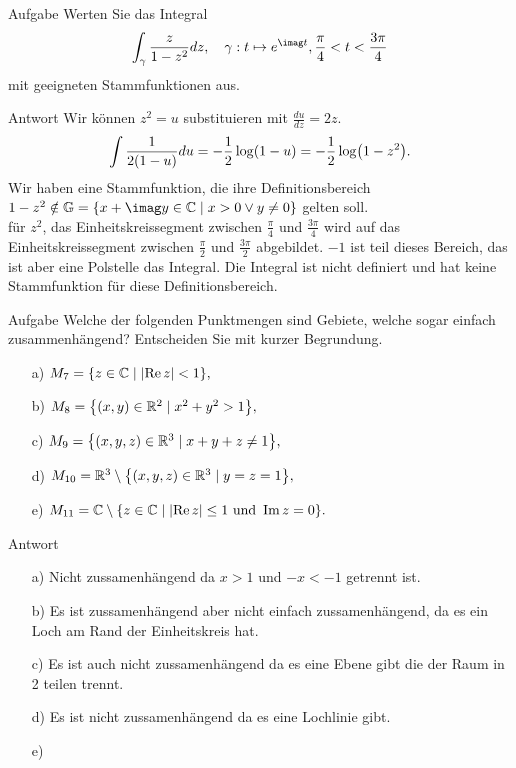 \documentclass{scrartcl}
\begin{document}
\begin{section}{Aufgabe}%
Werten Sie das Integral
\[\int_{\gamma}\frac{z}{1-z^2}dz,\quad \gamma:t\mapsto e^{\imag t},\frac{\pi}{4}<t<\frac{3 \pi}{4}\]
mit geeigneten Stammfunktionen aus.
    \begin{subsection}{Antwort}
        Wir können $z^2=u$ substituieren mit $\frac{du}{dz}=2z$.
        \[\int \frac{1}{2\qty(1-u)}du=-\frac{1}{2}\log(1-u)=-\frac{1}{2}\log(1-z^2).\]
        Wir haben eine Stammfunktion, die ihre Definitionsbereich $1-z^2\notin \mathbb G=\qty{x+\imag y\in \bC \mid x>0 \lor y\neq 0}$ gelten soll.\\
        für $z^2$, das Einheitskreissegment zwischen $\frac{\pi}{4}$ und $\frac{3\pi}{4}$ wird auf das Einheitskreissegment zwischen $\frac{\pi}{2}$ und $\frac{3 \pi}{2}$ abgebildet.
        $-1$ ist teil dieses Bereich, das ist aber eine Polstelle das Integral.
        Die Integral ist nicht definiert und hat keine Stammfunktion für diese Definitionsbereich.
    \end{subsection}
\end{section}
\begin{section}{Aufgabe}
    Welche der folgenden Punktmengen sind Gebiete, welche sogar einfach zusammenhängend?
Entscheiden Sie mit kurzer Begrundung.
\begin{itemize}
    \item[a)] \(M_7=\qty{z\in\mathbb{C}\mid \abs{\Re z}<1},\)
    \item[b)] \(M_8=\qty{\left(x,y\right) \in\mathbb{R}^2 \mid x^2+y^2>1},\)
    \item[c)] \(M_9=\qty{\left(x,y,z\right) \in\mathbb{R}^3 \mid x+y+z\neq 1},\)
    \item[d)] \(M_{10}=\mathbb{R}^3 \setminus \qty{\left(x,y,z\right) \in\mathbb{R}^3 \mid y=z= 1},\)
    \item[e)] \(M_{11}=\mathbb{C} \setminus \qty{z \in\mathbb{C}\mid \abs{\Re z}\leq 1 \text{ und } \Im z=0}.\)
\end{itemize}
      \begin{subsection}{Antwort}
        \begin{itemize}
\item[a)]
Nicht zussamenhängend da $x>1$ und $-x<-1$ getrennt ist.
\item[b)] Es ist zussamenhängend aber nicht einfach zussamenhängend, da es ein Loch am Rand der Einheitskreis hat.
\item[c)] Es ist auch nicht zussamenhängend da es eine Ebene gibt die der Raum in 2 teilen trennt.
\item[d)] Es ist nicht zussamenhängend da es eine Lochlinie gibt.
\item[e)]  



            \end{itemize}
    \end{subsection}  
\end{section}
\end{document}
